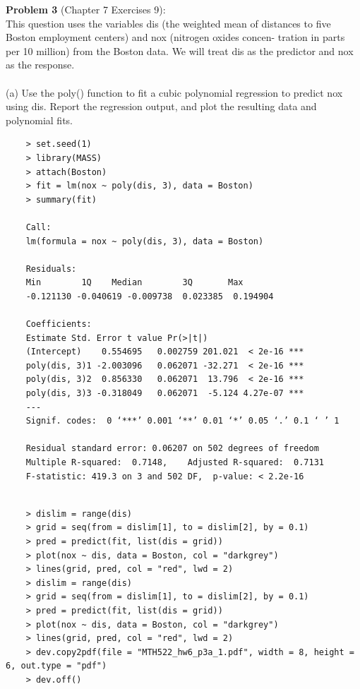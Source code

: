 \documentclass{article}
\begin{document}
\newpage

{\bf Problem 3} (Chapter 7 Exercises 9):\\
This question uses the variables dis (the weighted mean of distances to five Boston employment centers) and nox (nitrogen oxides concen- tration in parts per 10 million) from the Boston data. We will treat dis as the predictor and nox as the response.\\
\\
(a) Use the poly() function to fit a cubic polynomial regression to predict nox using dis. Report the regression output, and plot the resulting data and polynomial fits.\\

\begin{program}
	\begin{verbatim}
	> set.seed(1)
	> library(MASS)
	> attach(Boston)
	> fit = lm(nox ~ poly(dis, 3), data = Boston)
	> summary(fit)
	
	Call:
	lm(formula = nox ~ poly(dis, 3), data = Boston)
	
	Residuals:
	Min        1Q    Median        3Q       Max 
	-0.121130 -0.040619 -0.009738  0.023385  0.194904 
	
	Coefficients:
	Estimate Std. Error t value Pr(>|t|)    
	(Intercept)    0.554695   0.002759 201.021  < 2e-16 ***
	poly(dis, 3)1 -2.003096   0.062071 -32.271  < 2e-16 ***
	poly(dis, 3)2  0.856330   0.062071  13.796  < 2e-16 ***
	poly(dis, 3)3 -0.318049   0.062071  -5.124 4.27e-07 ***
	---
	Signif. codes:  0 ‘***’ 0.001 ‘**’ 0.01 ‘*’ 0.05 ‘.’ 0.1 ‘ ’ 1
	
	Residual standard error: 0.06207 on 502 degrees of freedom
	Multiple R-squared:  0.7148,	Adjusted R-squared:  0.7131 
	F-statistic: 419.3 on 3 and 502 DF,  p-value: < 2.2e-16
	
	\end{verbatim}
\end{program}


\begin{program}
	\begin{verbatim}
	> dislim = range(dis)
	> grid = seq(from = dislim[1], to = dislim[2], by = 0.1)
	> pred = predict(fit, list(dis = grid))
	> plot(nox ~ dis, data = Boston, col = "darkgrey")
	> lines(grid, pred, col = "red", lwd = 2)
	> dislim = range(dis)
	> grid = seq(from = dislim[1], to = dislim[2], by = 0.1)
	> pred = predict(fit, list(dis = grid))
	> plot(nox ~ dis, data = Boston, col = "darkgrey")
	> lines(grid, pred, col = "red", lwd = 2)
	> dev.copy2pdf(file = "MTH522_hw6_p3a_1.pdf", width = 8, height = 6, out.type = "pdf")
	> dev.off()
	\end{verbatim}
\end{program}
\end{document}
